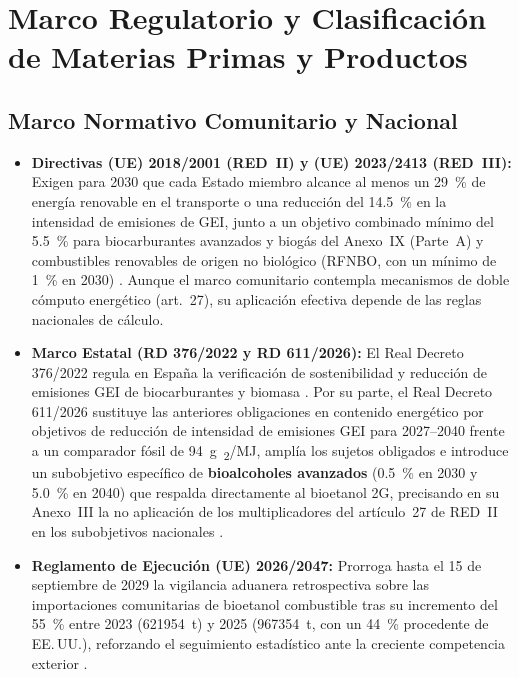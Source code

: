\documentclass{report}
\begin{document}
\begin{enumerate}
\end{enumerate}

\section{Marco Regulatorio y Clasificación de Materias Primas y Productos}

\subsection*{Marco Normativo Comunitario y Nacional}
\begin{itemize}
    \item \textbf{Directivas (UE) 2018/2001 (RED~II) y (UE) 2023/2413 (RED~III):} Exigen para 2030 que cada Estado miembro alcance al menos un \SI{29}{\percent} de energía renovable en el transporte o una reducción del \SI{14.5}{\percent} en la intensidad de emisiones de GEI, junto a un objetivo combinado mínimo del \SI{5.5}{\percent} para biocarburantes avanzados y biogás del Anexo~IX (Parte~A) y combustibles renovables de origen no biológico (RFNBO, con un mínimo de \SI{1}{\percent} en 2030) \autocite{REDII2018, REDIII2023}. Aunque el marco comunitario contempla mecanismos de doble cómputo energético (art.~27), su aplicación efectiva depende de las reglas nacionales de cálculo.
    \item \textbf{Marco Estatal (RD 376/2022 y RD 611/2026):} El Real Decreto 376/2022 regula en España la verificación de sostenibilidad y reducción de emisiones GEI de biocarburantes y biomasa \autocite{BOE376_2022}. Por su parte, el Real Decreto 611/2026 sustituye las anteriores obligaciones en contenido energético por objetivos de reducción de intensidad de emisiones GEI para 2027--2040 frente a un comparador fósil de \SI{94}{\gram{}_{2}/\mega\joule}, amplía los sujetos obligados e introduce un subobjetivo específico de \textbf{bioalcoholes avanzados} (\SI{0.5}{\percent} en 2030 y \SI{5.0}{\percent} en 2040) que respalda directamente al bioetanol 2G, precisando en su Anexo~III la no aplicación de los multiplicadores del artículo~27 de RED~II en los subobjetivos nacionales \autocite{BOE2026}.
    \item \textbf{Reglamento de Ejecución (UE) 2026/2047:} Prorroga hasta el 15 de septiembre de 2029 la vigilancia aduanera retrospectiva sobre las importaciones comunitarias de bioetanol combustible tras su incremento del \SI{55}{\percent} entre 2023 (\num{621954}~t) y 2025 (\num{967354}~t, con un \SI{44}{\percent} procedente de EE.\,UU.), reforzando el seguimiento estadístico ante la creciente competencia exterior \autocite[Considerandos~5--7 y 15, Art.~2]{DOUE2026}.
\end{itemize}
\end{document}
